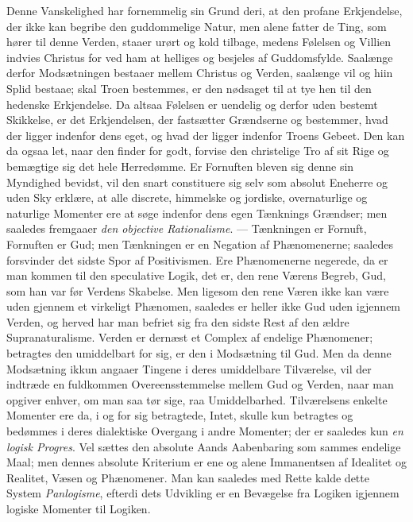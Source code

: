 \documentclass[12pt]{book}
\newcommand{\opage}[1]{\marginnote{\footnotesize\textit{[#1]}}}
\begin{document}
Denne Vanskelighed har fornemmelig sin Grund deri, at den profane Erkjendelse,
der ikke kan begribe den guddommelige Natur, men alene fatter de Ting, som
hører til denne Verden, staaer urørt og kold tilbage, medens Følelsen og
Villien indvies Christus for ved ham at helliges og besjeles af Guddomsfylde.
Saalænge derfor Modsætningen bestaaer mellem Christus og Verden, saalænge vil
og hiin Splid bestaae; skal Troen bestemmes, er den nødsaget til at tye hen til
den hedenske Erkjendelse. Da altsaa Følelsen er uendelig og derfor uden bestemt
Skikkelse, er det Erkjendelsen, der fastsætter Grændserne og bestemmer, hvad
der ligger indenfor dens eget, og hvad der ligger indenfor Troens Gebeet. Den
kan da ogsaa let, naar den finder for godt, forvise den christelige Tro af sit
Rige og bemægtige sig det hele Herredømme. Er Fornuften bleven sig denne sin
Myndighed bevidst, vil den snart constituere sig selv som absolut Eneherre og
uden Sky erklære, at alle discrete, himmelske og jordiske, overnaturlige og
naturlige Momenter ere at søge indenfor dens egen Tænknings Grændser; men
saaledes fremgaaer \emph{den objective Rationalisme}. --- Tænkningen er
Fornuft, Fornuften er Gud; men Tænkningen er en Negation af Phænomenerne;
saaledes forsvinder det sidste Spor af Positivismen. Ere Phænomenerne negerede,
da er man kommen til den speculative Logik, det er, den rene Værens Begreb,
Gud, som han var før Verdens Skabelse. Men ligesom den rene Væren ikke kan være
uden gjennem et virkeligt Phænomen, saaledes er heller ikke Gud uden igjennem
Verden, og herved har man befriet sig fra den
\opage{126} sidste Rest af den ældre Supranaturalisme. Verden er dernæst et Complex af
endelige Phænomener; betragtes den umiddelbart for sig, er den i Modsætning til
Gud. Men da denne Modsætning ikkun angaaer Tingene i deres umiddelbare
Tilværelse, vil der indtræde en fuldkommen Overeensstemmelse mellem Gud og
Verden, naar man opgiver enhver, om man saa tør sige, raa Umiddelbarhed.
Tilværelsens enkelte Momenter ere da, i og for sig betragtede, Intet, skulle
kun betragtes og bedømmes i deres dialektiske Overgang i andre Momenter; der er
saaledes kun \emph{en logisk Progres}. Vel sættes den absolute Aands
Aabenbaring som sammes endelige Maal; men dennes absolute Kriterium er ene og
alene Immanentsen af Idealitet og Realitet, Væsen og Phænomener. Man kan
saaledes med Rette kalde dette System \emph{Panlogisme}, efterdi dets Udvikling
er en Bevægelse fra Logiken igjennem logiske Momenter til Logiken.
\end{document}
